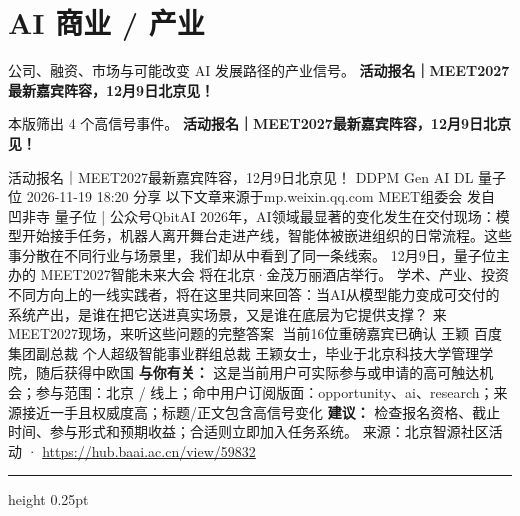 \documentclass[10.5pt]{ctexart}
\begin{document}
\section*{AI 商业 / 产业}
{\color{ormuted} 公司、融资、市场与可能改变 AI 发展路径的产业信号。}
\vspace{2mm}
{\LARGE\bfseries 活动报名｜MEET2027最新嘉宾阵容，12月9日北京见！}\par
\vspace{1mm}
{\color{ormuted} 本版筛出 4 个高信号事件。}
\vspace{3mm}
{\Large\bfseries 活动报名｜MEET2027最新嘉宾阵容，12月9日北京见！}\par
活动报名｜MEET2027最新嘉宾阵容，12月9日北京见！ DDPM Gen AI DL 量子位 2026-11-19 18:20 分享 以下文章来源于mp.weixin.qq.com MEET组委会 发自 凹非寺 量子位 | 公众号QbitAI 2026年，AI领域最显著的变化发生在交付现场：模型开始接手任务，机器人离开舞台走进产线，智能体被嵌进组织的日常流程。这些事分散在不同行业与场景里，我们却从中看到了同一条线索。 12月9日，量子位主办的 MEET2027智能未来大会 将在北京·金茂万丽酒店举行。 学术、产业、投资 不同方向上的一线实践者，将在这里共同来回答：当AI从模型能力变成可交付的系统产出，是谁在把它送进真实场景，又是谁在底层为它提供支撑？ 来MEET2027现场，来听这些问题的完整答案🔽 当前16位重磅嘉宾已确认 王颖 百度集团副总裁 个人超级智能事业群组总裁 王颖女士，毕业于北京科技大学管理学院，随后获得中欧国
\textbf{与你有关：} 这是当前用户可实际参与或申请的高可触达机会；参与范围：北京 / 线上；命中用户订阅版面：opportunity、ai、research；来源接近一手且权威度高；标题/正文包含高信号变化
\textbf{建议：} 检查报名资格、截止时间、参与形式和预期收益；合适则立即加入任务系统。
{\footnotesize\color{ormuted} 来源：北京智源社区活动 · \url{https://hub.baai.ac.cn/view/59832}}
\vspace{4mm}
\hrule height 0.25pt
\vspace{3mm}
\end{document}
